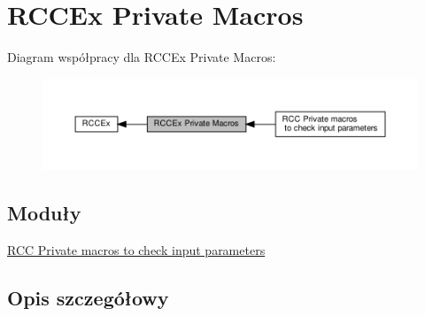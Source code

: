 \hypertarget{group___r_c_c_ex___private___macros}{}\section{R\+C\+C\+Ex Private Macros}
\label{group___r_c_c_ex___private___macros}
Diagram współpracy dla R\+C\+C\+Ex Private Macros\+:\nopagebreak
\begin{figure}[H]
\begin{center}
\leavevmode
\includegraphics[width=350pt]{group___r_c_c_ex___private___macros}
\end{center}
\end{figure}
\subsection*{Moduły}
\begin{DoxyCompactItemize}
\item 
\hyperlink{group___r_c_c_ex___i_s___r_c_c___definitions}{R\+C\+C Private macros to check input parameters}
\end{DoxyCompactItemize}


\subsection{Opis szczegółowy}
